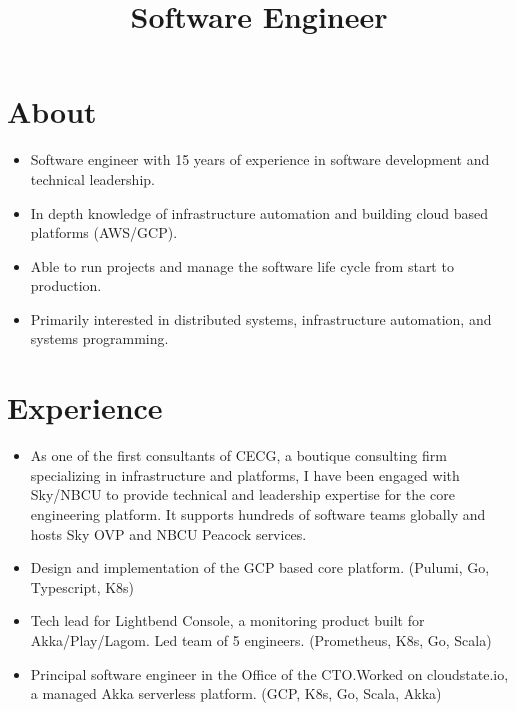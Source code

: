 \documentclass[11pt,a4paper,roman]{moderncv}
\title{Software Engineer}
\begin{document}
\makecvtitle{}

\section{About}
\begin{itemize}
  \item Software engineer with 15 years of experience in software development and technical leadership.
  \item In depth knowledge of infrastructure automation and building cloud based platforms (AWS/GCP).
  \item Able to run projects and manage the software life cycle from start to production.
  \item Primarily interested in distributed systems, infrastructure automation, and systems programming.
\end{itemize}

\section{Experience}

\begin{itemize}
  \item As one of the first consultants of CECG, a boutique consulting firm specializing in infrastructure and
        platforms, I have been engaged with Sky/NBCU to provide technical and leadership expertise for the core engineering
        platform.  It supports hundreds of software teams globally and hosts Sky OVP and NBCU Peacock services.
  \item Design and implementation of the GCP based core platform. (Pulumi, Go, Typescript, K8s)
\end{itemize}

\vspace{5mm}

\begin{itemize}
  \item Tech lead for Lightbend Console, a monitoring product built for Akka/Play/Lagom. Led
        team of 5 engineers. (Prometheus, K8s, Go, Scala)
  \item Principal software engineer in the Office of the CTO.\@ Worked on cloudstate.io, a managed Akka serverless platform.
        (GCP, K8s, Go, Scala, Akka)
\end{itemize}
\end{document}
